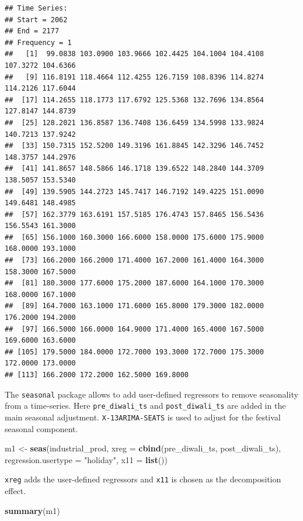 \documentclass[
]{article}
\newenvironment{Shaded}{\begin{snugshade}}{\end{snugshade}}
\newcommand{\AttributeTok}[1]{\textcolor[rgb]{0.13,0.29,0.53}{#1}}
\newcommand{\FunctionTok}[1]{\textcolor[rgb]{0.13,0.29,0.53}{\textbf{#1}}}
\newcommand{\NormalTok}[1]{#1}
\newcommand{\OtherTok}[1]{\textcolor[rgb]{0.56,0.35,0.01}{#1}}
\newcommand{\StringTok}[1]{\textcolor[rgb]{0.31,0.60,0.02}{#1}}
\begin{document}
\begin{verbatim}
## Time Series:
## Start = 2062 
## End = 2177 
## Frequency = 1 
##   [1]  99.0838 103.0900 103.9666 102.4425 104.1004 104.4108 107.3272 104.6366
##   [9] 116.8191 118.4664 112.4255 126.7159 108.8396 114.8274 114.2126 117.6044
##  [17] 114.2655 118.1773 117.6792 125.5368 132.7696 134.8564 127.8147 144.8739
##  [25] 128.2021 136.8587 136.7408 136.6459 134.5998 133.9824 140.7213 137.9242
##  [33] 150.7315 152.5200 149.3196 161.8845 142.3296 146.7452 148.3757 144.2976
##  [41] 141.8657 148.5866 146.1718 139.6522 148.2840 144.3709 138.5057 153.5340
##  [49] 139.5905 144.2723 145.7417 146.7192 149.4225 151.0090 149.6481 148.4985
##  [57] 162.3779 163.6191 157.5185 176.4743 157.8465 156.5436 156.5543 161.3000
##  [65] 156.1000 160.3000 166.6000 158.0000 175.6000 175.9000 168.0000 193.1000
##  [73] 166.2000 166.2000 171.4000 167.2000 161.4000 164.3000 158.3000 167.5000
##  [81] 180.3000 177.6000 175.2000 187.6000 164.1000 170.3000 168.0000 167.1000
##  [89] 164.7000 163.1000 171.6000 165.8000 179.3000 182.0000 176.2000 194.2000
##  [97] 166.5000 166.0000 164.9000 171.4000 165.4000 167.5000 169.6000 163.6000
## [105] 179.5000 184.0000 172.7000 193.3000 172.7000 175.3000 172.0000 173.0000
## [113] 166.2000 172.2000 162.5000 169.8000
\end{verbatim}

The \texttt{seasonal} package allows to add user-defined regressors to
remove seasonality from a time-series. Here \texttt{pre\_diwali\_ts} and
\texttt{post\_diwali\_ts} are added in the main seasonal adjustment.
\texttt{X-13ARIMA-SEATS} is used to adjust for the festival seasonal
component.

\begin{Shaded}
\begin{Highlighting}[]
\NormalTok{m1 }\OtherTok{\textless{}{-}} \FunctionTok{seas}\NormalTok{(industrial\_prod, }\AttributeTok{xreg =} \FunctionTok{cbind}\NormalTok{(pre\_diwali\_ts, post\_diwali\_ts), }\AttributeTok{regression.usertype =} \StringTok{"holiday"}\NormalTok{, }\AttributeTok{x11 =} \FunctionTok{list}\NormalTok{())}
\end{Highlighting}
\end{Shaded}

\texttt{xreg} adds the user-defined regressors and \texttt{x11} is
chosen as the decomposition effect.

\begin{Shaded}
\begin{Highlighting}[]
\FunctionTok{summary}\NormalTok{(m1)}
\end{Highlighting}
\end{Shaded}
\end{document}
